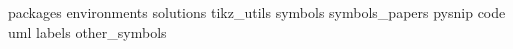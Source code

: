 \providecommand{\rootdir}{.}
\usepackage{import}

{packages}
{environments}
{solutions}
{tikz_utils}
{symbols}
{symbols_papers}
{pysnip}
{code}
{uml}
{labels}
{other_symbols}

